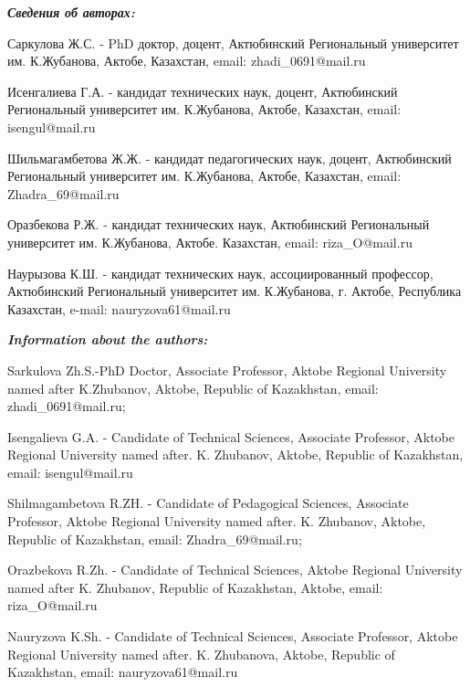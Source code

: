 \begin{authorinfo}
\emph{{\bfseries Сведения об авторах:}}

Саркулова Ж.С. - PhD доктор, доцент, Актюбинский Региональный университет
им. К.Жубанова, Актобе, Казахстан, email: zhadi\_0691@mail.ru

Исенгалиева Г.А. - кандидат технических наук, доцент, Актюбинский
Региональный университет им. К.Жубанова, Актобе, Казахстан, email:
isengul@mail.ru

Шильмагамбетова Ж.Ж. - кандидат педагогических наук, доцент, Актюбинский
Региональный университет им. К.Жубанова, Актобе, Казахстан, email:
Zhadra\_69@mail.ru

Оразбекова Р.Ж. - кандидат технических наук, Актюбинский Региональный
университет им. К.Жубанова, Актобе. Казахстан, email: riza\_O@mail.ru

Наурызова К.Ш. - кандидат технических наук, ассоциированный профессор,
Актюбинский Региональный университет им. К.Жубанова, г. Актобе,
Республика Казахстан, e-mail: nauryzova61@mail.ru

\emph{{\bfseries Information about the authors:}}

Sarkulova Zh.S.-PhD Doctor, Associate Professor, Aktobe Regional
University named after K.Zhubanov, Aktobe, Republic of Kazakhstan,
email: zhadi\_0691@mail.ru;

Isengalieva G.A. - Candidate of Technical Sciences, Associate Professor,
Aktobe Regional University named after. K. Zhubanov, Aktobe, Republic of
Kazakhstan, email: isengul@mail.ru

Shilmagambetova R.ZH. - Candidate of Pedagogical Sciences, Associate
Professor, Aktobe Regional University named after. K. Zhubanov, Aktobe,
Republic of Kazakhstan, email: Zhadra\_69@mail.ru;

Orazbekova R.Zh. - Candidate of Technical Sciences, Aktobe Regional
University named after K. Zhubanov, Republic of Kazakhstan, Aktobe,
email: riza\_O@mail.ru

Nauryzova K.Sh. - Candidate of Technical Sciences, Associate Professor,
Aktobe Regional University named after. K. Zhubanova, Aktobe, Republic
of Kazakhstan, email: nauryzova61@mail.ru
\end{authorinfo}
